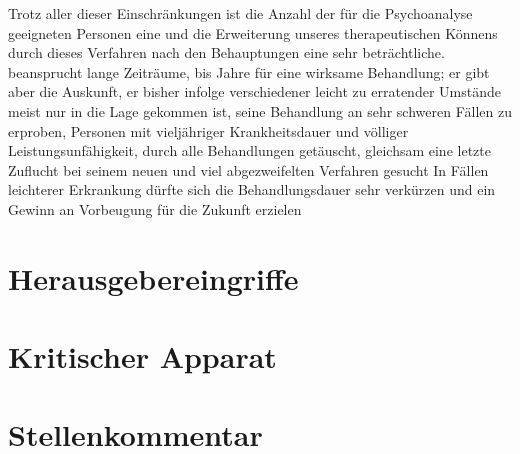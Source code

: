 \documentclass[twoside=true,titlepage=false,open=any, parskip=never, fontsize=10pt, headings=small, chapterprefix=false, appendixprefix=false]{scrbook}
\begin{document}
            
        \pstart
        Trotz aller dieser Einschränkungen ist die Anzahl der für die Psychoanalyse
               geeigneten Personen eine und die Erweiterung unseres therapeutischen Könnens durch dieses
               Verfahren nach den Behauptungen  eine sehr beträchtliche. 
               beansprucht lange Zeiträume,  bis  Jahre für eine wirksame Behandlung; er gibt aber die Auskunft,  er bisher infolge verschiedener leicht zu erratender Umstände meist nur
               in die Lage gekommen ist, seine Behandlung an sehr schweren Fällen zu erproben,
               Personen mit vieljähriger Krankheitsdauer und völliger Leistungsunfähigkeit,  durch alle Behandlungen getäuscht, gleichsam eine letzte Zuflucht bei
               seinem neuen und viel abgezweifelten Verfahren gesucht  In Fällen leichterer Erkrankung dürfte sich die Behandlungsdauer
               sehr verkürzen und ein  Gewinn an Vorbeugung für die Zukunft erzielen 
               
            
        \pend
    
         
        \endnumbering
        
        \section*{Herausgebereingriffe}
  
        \section*{Kritischer Apparat}
        
        \section*{Stellenkommentar}
        
        \printindex[person]
        \printindex[kw]
        


        
\end{document}
